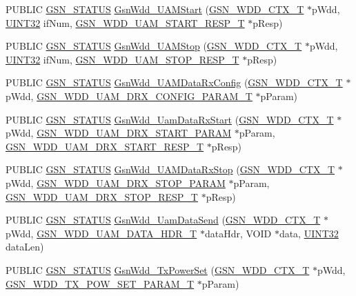 \begin{DoxyCompactItemize}
\item 
PUBLIC \hyperlink{a00660_gada5951904ac6110b1fa95e51a9ddc217}{GSN\_\-STATUS} \hyperlink{a00603_aead66fd4862fa889f8ff19856a815300}{GsnWdd\_\-UAMStart} (\hyperlink{a00108}{GSN\_\-WDD\_\-CTX\_\-T} $\ast$pWdd, \hyperlink{a00660_gae1e6edbbc26d6fbc71a90190d0266018}{UINT32} ifNum, \hyperlink{a00316}{GSN\_\-WDD\_\-UAM\_\-START\_\-RESP\_\-T} $\ast$pResp)
\item 
PUBLIC \hyperlink{a00660_gada5951904ac6110b1fa95e51a9ddc217}{GSN\_\-STATUS} \hyperlink{a00603_a4109018738ac40b121930b8c72f3779b}{GsnWdd\_\-UAMStop} (\hyperlink{a00108}{GSN\_\-WDD\_\-CTX\_\-T} $\ast$pWdd, \hyperlink{a00660_gae1e6edbbc26d6fbc71a90190d0266018}{UINT32} ifNum, \hyperlink{a00317}{GSN\_\-WDD\_\-UAM\_\-STOP\_\-RESP\_\-T} $\ast$pResp)
\item 
PUBLIC \hyperlink{a00660_gada5951904ac6110b1fa95e51a9ddc217}{GSN\_\-STATUS} \hyperlink{a00603_a121dfe825456ee1a48df189918ac24f1}{GsnWdd\_\-UAMDataRxConfig} (\hyperlink{a00108}{GSN\_\-WDD\_\-CTX\_\-T} $\ast$pWdd, \hyperlink{a00306}{GSN\_\-WDD\_\-UAM\_\-DRX\_\-CONFIG\_\-PARAM\_\-T} $\ast$pParam)
\item 
PUBLIC \hyperlink{a00660_gada5951904ac6110b1fa95e51a9ddc217}{GSN\_\-STATUS} \hyperlink{a00603_a5d1c80f5cbdeaeed8981b98651a3a44f}{GsnWdd\_\-UamDataRxStart} (\hyperlink{a00108}{GSN\_\-WDD\_\-CTX\_\-T} $\ast$pWdd, \hyperlink{a00310}{GSN\_\-WDD\_\-UAM\_\-DRX\_\-START\_\-PARAM} $\ast$pParam, \hyperlink{a00311}{GSN\_\-WDD\_\-UAM\_\-DRX\_\-START\_\-RESP\_\-T} $\ast$pResp)
\item 
PUBLIC \hyperlink{a00660_gada5951904ac6110b1fa95e51a9ddc217}{GSN\_\-STATUS} \hyperlink{a00603_a39a171245db4d0d1fc2ea999bc983eb2}{GsnWdd\_\-UAMDataRxStop} (\hyperlink{a00108}{GSN\_\-WDD\_\-CTX\_\-T} $\ast$pWdd, \hyperlink{a00312}{GSN\_\-WDD\_\-UAM\_\-DRX\_\-STOP\_\-PARAM} $\ast$pParam, \hyperlink{a00313}{GSN\_\-WDD\_\-UAM\_\-DRX\_\-STOP\_\-RESP\_\-T} $\ast$pResp)
\item 
PUBLIC \hyperlink{a00660_gada5951904ac6110b1fa95e51a9ddc217}{GSN\_\-STATUS} \hyperlink{a00603_a070bd6272bf919d8c70c31887890774e}{GsnWdd\_\-UamDataSend} (\hyperlink{a00108}{GSN\_\-WDD\_\-CTX\_\-T} $\ast$pWdd, \hyperlink{a00314}{GSN\_\-WDD\_\-UAM\_\-DATA\_\-HDR\_\-T} $\ast$dataHdr, VOID $\ast$data, \hyperlink{a00660_gae1e6edbbc26d6fbc71a90190d0266018}{UINT32} dataLen)
\item 
PUBLIC \hyperlink{a00660_gada5951904ac6110b1fa95e51a9ddc217}{GSN\_\-STATUS} \hyperlink{a00603_a022e8be8dffdb8e04bcafbfc49b70c5d}{GsnWdd\_\-TxPowerSet} (\hyperlink{a00108}{GSN\_\-WDD\_\-CTX\_\-T} $\ast$pWdd, \hyperlink{a00408}{GSN\_\-WDD\_\-TX\_\-POW\_\-SET\_\-PARAM\_\-T} $\ast$pParam)

\end{DoxyCompactItemize}
